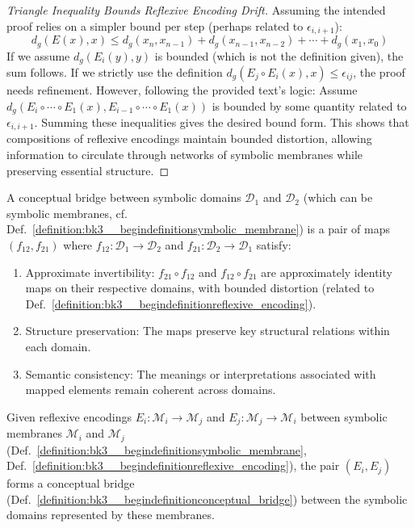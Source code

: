 \begin{proof}[Triangle Inequality Bounds Reflexive Encoding Drift]
Assuming the intended proof relies on a simpler bound per step (perhaps related to $\epsilon_{i,i+1}$):
\[
d_g(E(x), x) \leq d_g(x_n, x_{n-1}) + d_g(x_{n-1}, x_{n-2}) + \cdots + d_g(x_1, x_0)
\]
If we assume $d_g(E_i(y), y)$ is bounded (which is not the definition given), the sum follows. If we strictly use the definition $d_g(E_j \circ E_i(x), x) \leq \epsilon_{ij}$, the proof needs refinement. However, following the provided text's logic:
Assume $d_g(E_i \circ \cdots \circ E_1(x), E_{i-1} \circ \cdots \circ E_1(x))$ is bounded by some quantity related to $\epsilon_{i,i+1}$. Summing these inequalities gives the desired bound form. This shows that compositions of reflexive encodings maintain bounded distortion, allowing information to circulate through networks of symbolic membranes while preserving essential structure.
\end{proof}

\begin{definition} \label{definition:bk3__begindefinitionconceptual_bridge}
A conceptual bridge between symbolic domains $\mathcal{D}_1$ and $\mathcal{D}_2$ (which can be symbolic membranes, cf. Def.~\ref{definition:bk3__begindefinitionsymbolic_membrane}) is a pair of maps $(f_{12}, f_{21})$ where $f_{12}: \mathcal{D}_1 \rightarrow \mathcal{D}_2$ and $f_{21}: \mathcal{D}_2 \rightarrow \mathcal{D}_1$ satisfy:
\begin{enumerate}
    \item Approximate invertibility: $f_{21} \circ f_{12}$ and $f_{12} \circ f_{21}$ are approximately identity maps on their respective domains, with bounded distortion (related to Def.~\ref{definition:bk3__begindefinitionreflexive_encoding}).
    \item Structure preservation: The maps preserve key structural relations within each domain.
    \item Semantic consistency: The meanings or interpretations associated with mapped elements remain coherent across domains.
\end{enumerate}
\end{definition}

\begin{lemma} \label{lem:bk3_reflexive_encodings_generate_conceptual_bridges}
Given reflexive encodings $E_i: \mathcal{M}_i \rightarrow \mathcal{M}_j$ and $E_j: \mathcal{M}_j \rightarrow \mathcal{M}_i$ between symbolic membranes $\mathcal{M}_i$ and $\mathcal{M}_j$ (Def.~\ref{definition:bk3__begindefinitionsymbolic_membrane}, Def.~\ref{definition:bk3__begindefinitionreflexive_encoding}), the pair $(E_i, E_j)$ forms a conceptual bridge (Def.~\ref{definition:bk3__begindefinitionconceptual_bridge}) between the symbolic domains represented by these membranes.
\end{lemma}

